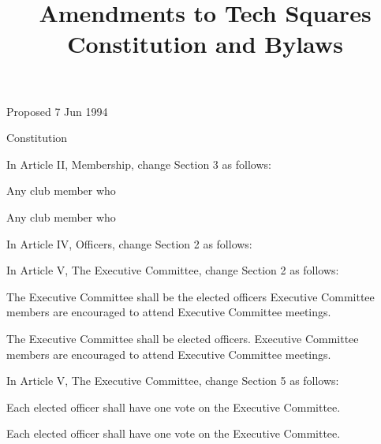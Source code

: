 \amendment
\title{Amendments to Tech Squares Constitution and Bylaws}

\maketitle
\begin{history}
Proposed 7 Jun 1994
\end{history}

Constitution


\nextchange
In Article II, Membership, change Section 3 as follows:

\current Any club member who 

\revised Any club member who 


\nextchange
In Article IV, Officers, change Section 2 as follows:

\current {}

\revised {}


\nextchange
In Article V, The Executive Committee, change Section 2 as follows:

\current The  Executive Committee shall be
the elected  officers 
Executive Committee members are encouraged to attend Executive
Committee meetings.

\revised The Executive Committee shall be  elected
officers.  Executive Committee members are encouraged to attend Executive
Committee meetings.


\nextchange
In Article V, The Executive Committee, change Section 5 as follows:

\current Each elected officer shall have one vote on the Executive Committee.

\revised Each elected officer shall have one vote on the Executive Committee.


